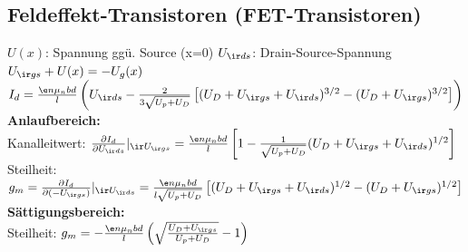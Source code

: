 \documentclass[fs, footer]{latex4ei}
\begin{document}
\begin{multicols*}{4}
\section{Feldeffekt-Transistoren (FET-Transistoren)}
$U(x)$: Spannung ggü. Source (x=0) \quad $U_{\ir ds}$: Drain-Source-Spannung\\
$U_{\ir gs} + U(x) = - U_g(x)$\\
$I_d = \frac{\e n\mu_nbd}{l}\left(U_{\ir ds}-\frac{2}{3\sqrt{U_p+U_D}}\left[(U_D+U_{\ir gs}+U_{\ir ds})^{3/2}-(U_D+U_{\ir gs})^{3/2}\right]\right)$\\
\textbf{Anlaufbereich:}\\
Kanalleitwert: $\frac{\partial I_d}{\partial U_{\ir ds}}|_{\ir U_{\ir gs}} = \frac{\e n\mu_nbd}{l}\left[1-\frac{1}{\sqrt{U_p+U_D}}(U_D+U_{\ir gs}+U_{\ir ds})^{1/2}\right]$\\
Steilheit: $g_m =\frac{\partial I_d}{\partial (-U_{\ir gs})}|_{\ir U_{\ir ds}} =  \frac{\e n\mu_nbd}{l\sqrt{U_p+U_D}}\left[(U_D+U_{\ir gs}+U_{\ir ds})^{1/2}-(U_D+U_{\ir gs})^{1/2}\right]$\\
\textbf{Sättigungsbereich:}\\
Steilheit: $g_m = -\frac{\e n\mu_nbd}{l}\left(\sqrt{\frac{U_D+U_{\ir gs}}{U_p+U_D}}-1\right)$
\end{multicols*}

\end{document}
